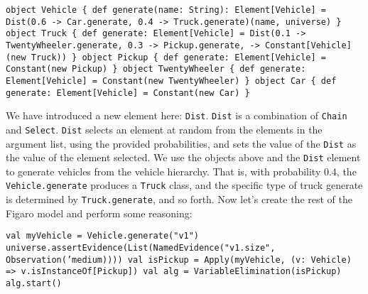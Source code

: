 \begin{flushleft}
\texttt{object Vehicle \{
\newline def generate(name: String): Element[Vehicle] =
\newline \tab Dist(0.6 -> Car.generate, 0.4 -> Truck.generate)(name, universe)
\newline \}
\newline object Truck \{
\newline \tab def generate: Element[Vehicle] =
\newline \tab Dist(0.1 -> TwentyWheeler.generate, 0.3 -> Pickup.generate,
\newline {} -> Constant[Vehicle](new Truck))
\newline \}
\newline object Pickup \{
\newline \tab def generate: Element[Vehicle] = Constant(new Pickup)
\newline \}
\newline object TwentyWheeler \{
\newline \tab def generate: Element[Vehicle] = Constant(new TwentyWheeler)
\newline \}
\newline object Car \{
\newline \tab def generate: Element[Vehicle] = Constant(new Car)
\newline \}}
\end{flushleft}

We have introduced a new element here: \texttt{Dist}. \texttt{Dist} is a combination of \texttt{Chain} and \texttt{Select}. \texttt{Dist} selects an element at random from the elements in the argument list, using the provided probabilities, and sets the value of the \texttt{Dist} as the value of the element selected. We use the objects above and the \texttt{Dist} element to generate vehicles from the vehicle hierarchy. That is, with probability 0.4, the \texttt{Vehicle.generate} produces a \texttt{Truck} class, and the specific type of truck generate is determined by \texttt{Truck.generate}, and so forth. Now let's create the rest of the Figaro model and perform some reasoning:

\begin{flushleft}
\texttt{val myVehicle = Vehicle.generate("v1")
\newline universe.assertEvidence(List(NamedEvidence("v1.size", Observation('medium))))
\newline val isPickup = Apply(myVehicle, (v: Vehicle) =>
\newline v.isInstanceOf[Pickup])
\newline val alg = VariableElimination(isPickup)
\newline alg.start()}
\end{flushleft}

